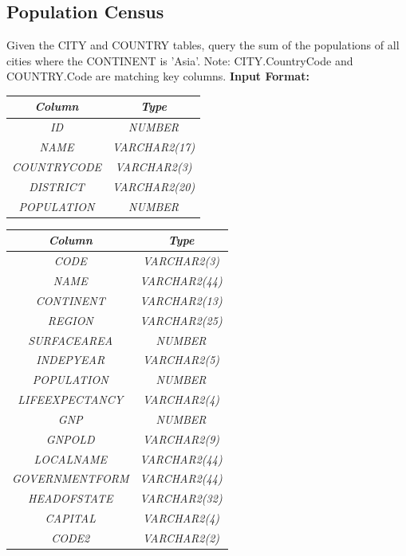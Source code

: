\documentclass[12pt,a4paper]{article}
\renewcommand{\arraystretch}{1.5} %
\begin{document}
\subsection{Population Census}
Given the CITY and COUNTRY tables, query the sum of the populations of all cities where the CONTINENT is 'Asia'.
\newline
Note: CITY.CountryCode and COUNTRY.Code are matching key columns.
\newline
\textbf{Input Format:}
\begin{table}[H]
\centering
\renewcommand{\arraystretch}{1.3}
\begin{tabular}{|c|c|}
\hline
\textit{Column} & \textit{Type} \\ \hline
\textit{ID} & \textit{NUMBER} \\ \hline
\textit{NAME} & \textit{VARCHAR2(17)} \\ \hline
\textit{COUNTRYCODE} & \textit{VARCHAR2(3)} \\ \hline
\textit{DISTRICT} & \textit{VARCHAR2(20)} \\ \hline
\textit{POPULATION} & \textit{NUMBER} \\ \hline
\end{tabular}
\end{table}
\begin{table}[H]
\centering
\renewcommand{\arraystretch}{1.3}
\begin{tabular}{|c|c|}
\hline
\textit{Column} & \textit{Type} \\ \hline   
\textit{CODE} & \textit{VARCHAR2(3)} \\ \hline
\textit{NAME} & \textit{VARCHAR2(44)} \\ \hline
\textit{CONTINENT} & \textit{VARCHAR2(13)} \\ \hline
\textit{REGION} & \textit{VARCHAR2(25)} \\ \hline
\textit{SURFACEAREA} & \textit{NUMBER} \\ \hline
\textit{INDEPYEAR} & \textit{VARCHAR2(5)} \\ \hline
\textit{POPULATION} & \textit{NUMBER} \\ \hline
\textit{LIFEEXPECTANCY} & \textit{VARCHAR2(4)} \\ \hline
\textit{GNP} & \textit{NUMBER} \\ \hline
\textit{GNPOLD} & \textit{VARCHAR2(9)} \\ \hline
\textit{LOCALNAME} & \textit{VARCHAR2(44)} \\ \hline
\textit{GOVERNMENTFORM} & \textit{VARCHAR2(44)} \\ \hline
\textit{HEADOFSTATE} & \textit{VARCHAR2(32)} \\ \hline
\textit{CAPITAL} & \textit{VARCHAR2(4)} \\ \hline
\textit{CODE2} & \textit{VARCHAR2(2)} \\ \hline
\end{tabular}
\end{table}
\end{document}
